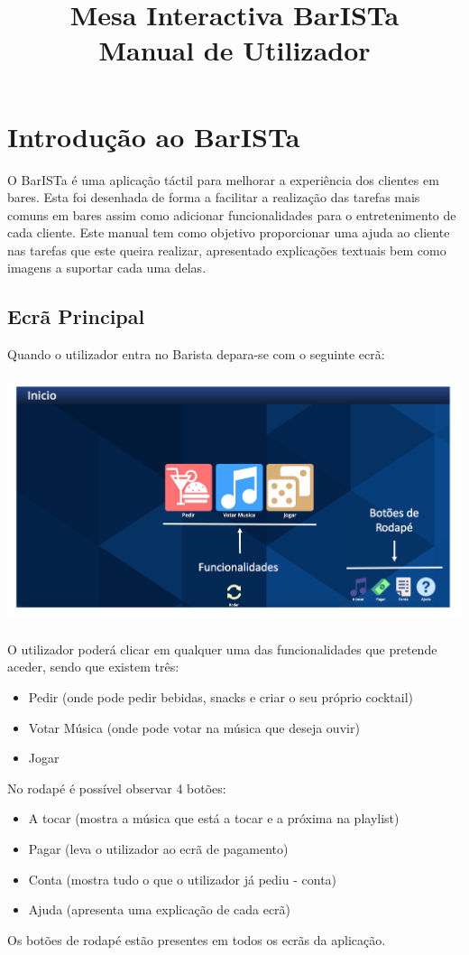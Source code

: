 \documentclass{article}
\title{\vspace{5cm}\textbf{Mesa Interactiva BarISTa}\\Manual de Utilizador}
\begin{document}
\maketitle
\newpage

\tableofcontents
\newpage

\section{Introdução ao BarISTa}
O BarISTa é uma aplicação táctil para melhorar a experiência dos clientes em bares. Esta foi desenhada de forma a facilitar a realização das tarefas mais comuns em bares assim como adicionar funcionalidades para o entretenimento de cada cliente.
Este manual tem como objetivo proporcionar uma ajuda ao cliente nas tarefas que este queira realizar, apresentado explicações textuais bem como imagens a suportar cada uma delas.
\subsection{Ecrã Principal}
Quando o utilizador entra no Barista depara-se com o seguinte ecrã:\\
\includegraphics[width=15cm, height=8cm]{user_manual_images/chick.png}
O utilizador poderá clicar em qualquer uma das funcionalidades que pretende aceder, sendo que existem três:
\begin{itemize} 
\item Pedir (onde pode pedir bebidas, snacks e criar o seu próprio cocktail)
\item Votar Música  (onde pode votar na música que deseja ouvir)
\item Jogar 
\end{itemize}
No rodapé é possível observar 4 botões:
\begin{itemize} 
\item A tocar (mostra a música que está a tocar e a próxima na playlist)
\item Pagar   (leva o utilizador ao ecrã de pagamento)
\item Conta   (mostra tudo o que o utilizador já pediu - conta)
\item Ajuda   (apresenta uma explicação de cada ecrã)
\end{itemize}
Os botões de rodapé estão presentes em todos os ecrãs da aplicação.
\end{document}
